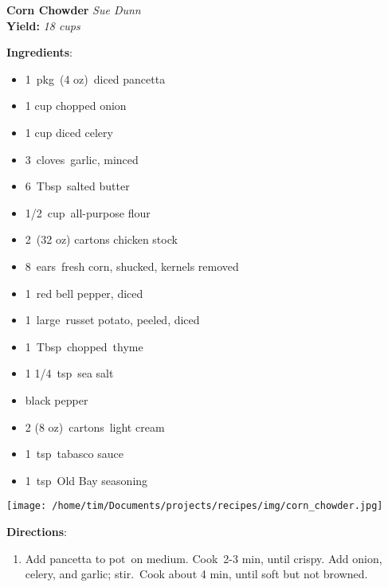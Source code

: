 \documentclass[11pt, twoside, openany]{book}
\begin{document}
\noindent\begin{minipage}[t]{\linewidth}%
{\Large\textbf{Corn Chowder}} \label{corn-chowder}\hfill\textit{Sue Dunn}\\
\textbf{Yield:} \textit{18 cups}\\
\noindent\begin{minipage}[t]{0.78\linewidth}%
\textbf{Ingredients}:\vspace{-3mm}
\begin{multicols}{2}
\begin{itemize}\setlength\itemsep{-1mm}
\item 1 pkg (4 oz) diced pancetta
\item 1 cup chopped onion
\item 1 cup diced celery
\item 3 cloves garlic, minced
\item 6 Tbsp salted butter
\item 1/2 cup all-purpose flour
\item 2 (32 oz) cartons chicken stock
\item 8 ears fresh corn, shucked, kernels removed
\item 1 red bell pepper, diced
\item 1 large russet potato, peeled, diced
\item 1 Tbsp chopped thyme
\item 1 1/4 tsp sea salt
\item black pepper
\item 2 (8 oz) cartons light cream
\item 1 tsp tabasco sauce
\item 1 tsp Old Bay seasoning
\end{itemize}
\end{multicols}
\end{minipage}
\noindent\begin{minipage}[t]{0.18\linewidth}
\centering \strut\vspace*{-\baselineskip}\newline
\texttt{[image: /home/tim/Documents/projects/recipes/img/corn\_chowder.jpg]}\\
\end{minipage}\vspace{3mm}
\textbf{Directions}:
\vspace{-3mm}\begin{enumerate}\setlength\itemsep{-1mm}
\item Add pancetta to pot on medium. Cook 2-3 min, until crispy. Add onion, celery, and garlic; stir. Cook about 4 min, until soft but not browned.

\end{enumerate}
\end{minipage}
\end{document}
